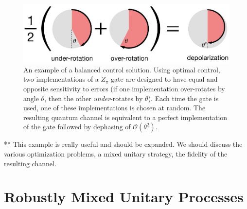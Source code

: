 \documentclass[aps,nofootinbib,pra,notitlepage,twocolumn]{revtex4-1}
\newcommand{\order}[1]{\mathcal{O}\left( #1 \right)}
\begin{document}
\begin{figure}
  \centering
  \includegraphics[width=\columnwidth]{simple_example.pdf}
  \caption{An example of a balanced control solution. Using optimal control, two implementations of a $Z_\pi$ gate are designed to have equal and opposite sensitivity to errors (if one implementation over-rotates by angle $\theta$, then the other \emph{under}-rotates by $\theta$). Each time the gate is used, one of these implementations is chosen at random. The resulting quantum channel is equivalent to a perfect implementation of the gate followed by dephasing of $\order{\theta^2}$.}
  \label{fig:simple_example}
\end{figure}

** This example is really useful and should be expanded. We should discuss the various optimization problems, a mixed unitary strategy, the fidelity of the resulting channel.


\section{Robustly Mixed Unitary Processes}
\label{sec:robustly_mixed}
\end{document}
